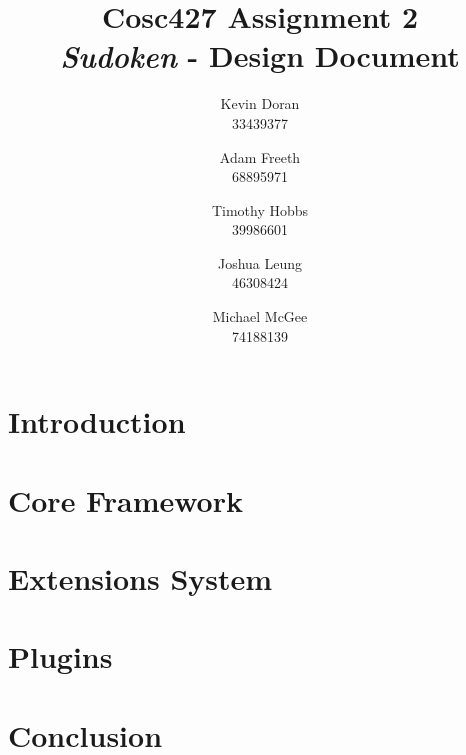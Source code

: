 \documentclass[a4paper, 11pt]{article}
\title{\textbf{Cosc427 Assignment 2} \\ {\textit{Sudoken} - Design Document}}
\author{
	Kevin Doran    \\ 33439377 \and
	Adam Freeth    \\ 68895971 \and
	Timothy Hobbs  \\ 39986601 \and
	Joshua Leung   \\ 46308424 \and
	Michael McGee  \\ 74188139
}
\begin{document}
\maketitle


\section{Introduction}


\section{Core Framework}
%

\section{Extensions System}
%

\section{Plugins}

\section{Conclusion}
%
\end{document}
